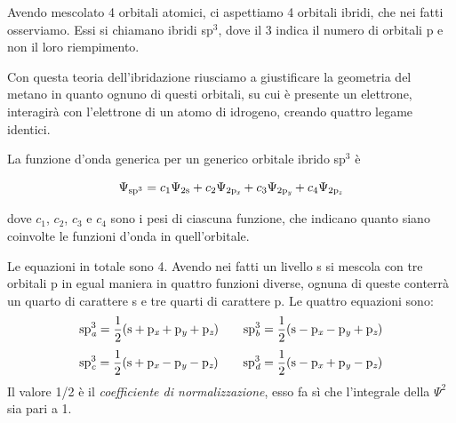 Avendo mescolato 4 orbitali atomici, ci aspettiamo 4 orbitali ibridi, che nei fatti osserviamo. Essi si chiamano ibridi sp$^3$, dove il 3 indica il numero di orbitali p e non il loro riempimento. 

Con questa teoria dell'ibridazione riusciamo a giustificare la geometria del metano in quanto ognuno di questi orbitali, su cui è presente un elettrone, interagirà con l'elettrone di un atomo di idrogeno, creando quattro legame identici.

\vspace{0.2cm}La funzione d'onda generica per un generico orbitale ibrido sp$^3$ è

$$\Psi_{\rm sp^3}=c_1\Psi_{\rm 2s} + c_2\Psi_{\rm 2p_\textit{x}} + c_3\Psi_{\rm 2p_\textit{y}} + c_4\Psi_{\rm 2p_\textit{z}}$$

dove $c_1$, $c_2$, $c_3$ e $c_4$ sono i pesi di ciascuna funzione, che indicano quanto siano coinvolte le funzioni d'onda in quell'orbitale.

Le equazioni in totale sono 4. Avendo nei fatti un livello s si mescola con tre orbitali p in egual maniera in quattro funzioni diverse, ognuna di queste conterrà un quarto di carattere s e tre quarti di carattere p. Le quattro equazioni sono:
$$\rm sp_\textit{a}^3=\frac{1}{2}(s + p_\textit{x} + p_\textit{y} + p_\textit{z}) \qquad sp_\textit{b}^3=\frac{1}{2}(s - p_\textit{x} - p_\textit{y} + p_\textit{z})$$
$$\rm sp_\textit{c}^3=\frac{1}{2}(s + p_\textit{x} - p_\textit{y} - p_\textit{z}) \qquad sp_\textit{d}^3=\frac{1}{2}(s - p_\textit{x} + p_\textit{y} - p_\textit{z})$$
Il valore 1/2 è il \textit{coefficiente di normalizzazione}, esso fa sì che l'integrale della $\Psi^2$ sia pari a 1.


